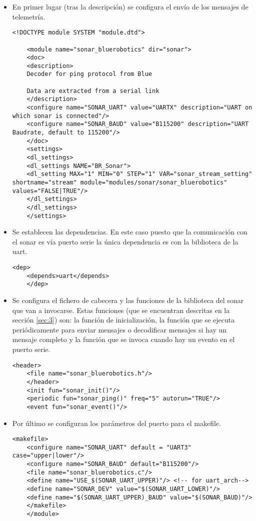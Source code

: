 \begin{itemize}
	\item En primer lugar (tras la descripción) se configura el envío de los mensajes de telemetría.
	\begin{lstlisting}[style=XML]
	<!DOCTYPE module SYSTEM "module.dtd">
	
	<module name="sonar_bluerobotics" dir="sonar">
	<doc>
	<description>
	Decoder for ping protocol from Blue
	
	Data are extracted from a serial link 
	</description>
	<configure name="SONAR_UART" value="UARTX" description="UART on which sonar is connected"/>
	<configure name="SONAR_BAUD" value="B115200" description="UART Baudrate, default to 115200"/>
	</doc>
	<settings>
	<dl_settings>
	<dl_settings NAME="BR_Sonar">
	<dl_setting MAX="1" MIN="0" STEP="1" VAR="sonar_stream_setting" shortname="stream" module="modules/sonar/sonar_bluerobotics" values="FALSE|TRUE"/>
	</dl_settings>
	</dl_settings>
	</settings>
	\end{lstlisting}
	
	\item Se establecen las dependencias. En este caso puesto que la comunicación con el sonar es vía puerto serie la única dependencia es con la biblioteca de la uart.
	\begin{lstlisting}[style=XML]
	<dep>
	<depends>uart</depends>
	</dep>
	\end{lstlisting}
	
	\item Se configura el fichero de cabecera y las funciones de la biblioteca del sonar que van a invocarse. Estas funciones (que se encuentran descritas en la sección \ref{sec:3}) son: la función de inicialización, la función que se ejecuta periódicamente para enviar mensajes o decodificar mensajes si hay un mensaje completo y la función que se invoca cuando hay un evento en el puerto serie.
	\begin{lstlisting}[style=XML]
	<header>
	<file name="sonar_bluerobotics.h"/>
	</header>
	<init fun="sonar_init()"/>
	<periodic fun="sonar_ping()" freq="5" autorun="TRUE"/>
	<event fun="sonar_event()"/>
	\end{lstlisting}
	
	\item Por último se configuran los parámetros del puerto para el makefile.
	\begin{lstlisting}[style=XML]
	<makefile>
	<configure name="SONAR_UART" default = "UART3" case="upper|lower"/>
	<configure name="SONAR_BAUD" default="B115200"/>
	<file name="sonar_bluerobotics.c"/>
	<define name="USE_$(SONAR_UART_UPPER)"/> <!-- for uart_arch-->
	<define name="SONAR_DEV" value="$(SONAR_UART_LOWER)"/>
	<define name="$(SONAR_UART_UPPER)_BAUD" value="$(SONAR_BAUD)"/>
	</makefile>
	</module>
	\end{lstlisting}
\end{itemize}

